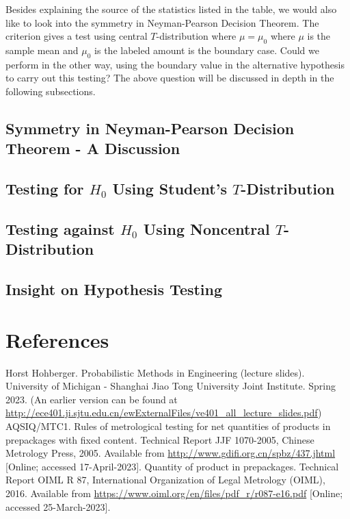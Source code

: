 \documentclass[12pt]{article}
\begin{document}
Besides explaining the source of the statistics listed in the table, we would also like to look into the symmetry in Neyman-Pearson Decision Theorem. The criterion gives a test using central $T$-distribution where $\mu=\mu_0$ where $\mu$ is the sample mean and $\mu_0$ is the labeled amount is the boundary case. Could we perform in the other way, using the boundary value in the alternative hypothesis to carry out this testing? The above question will be discussed in depth in the following subsections.

\subsection{Symmetry in Neyman-Pearson Decision Theorem - A Discussion}

\subsection{Testing for $H_0$ Using Student's $T$-Distribution}

\subsection{Testing against $H_0$ Using Noncentral $T$-Distribution}

\subsection{Insight on Hypothesis Testing}

\newpage
    \section{References}
    \begingroup  %
    \renewcommand{\section}[2]{} 
    \begin{thebibliography}{99}
         Horst Hohberger. Probabilistic Methods in Engineering (lecture slides). University of Michigan - Shanghai Jiao Tong University Joint Institute. Spring 2023. (An earlier version can be found at \href{http://ece401.ji.sjtu.edu.cn/ewExternalFiles/ve401\_all\_lecture\_slides.pdf}{http://ece401.ji.sjtu.edu.cn/ewExternalFiles/ve401\_all\_lecture\_slides.pdf})
         AQSIQ/MTC1. Rules of metrological testing for net quantities of products in prepackages with fixed content. Technical Report JJF 1070-2005, Chinese Metrology Press, 2005. Available from \href{http://www.gdifi.org.cn/spbz/437.jhtml}{http://www.gdifi.org.cn/spbz/437.jhtml} [Online; accessed 17-April-2023].
		 Quantity of product in prepackages. Technical Report OIML R 87, International Organization of Legal Metrology (OIML), 2016. Available from \href{https://www.oiml.org/en/files/pdf\_r/r087-e16.pdf}{https://www.oiml.org/en/files/pdf\_r/r087-e16.pdf} [Online; accessed 25-March-2023].
    \end{thebibliography}
    \endgroup
\end{document}
